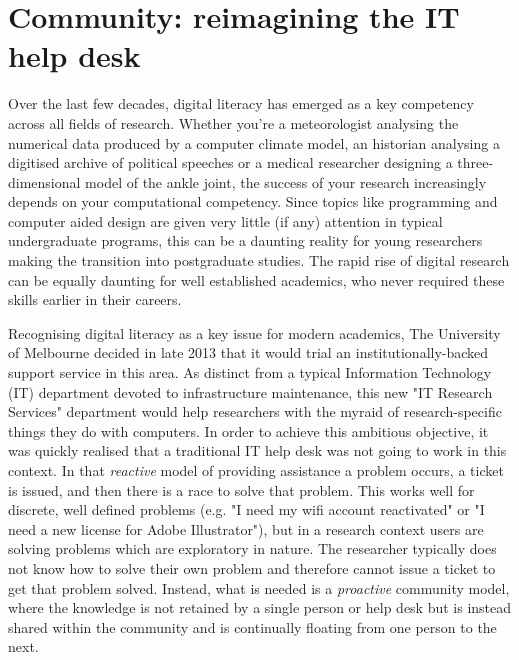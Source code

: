 \section{Community: reimagining the IT help desk}

Over the last few decades, digital literacy has emerged as a key competency across all fields of research. Whether you're a meteorologist analysing the numerical data produced by a computer climate model, an historian analysing a digitised archive of political speeches or a medical researcher designing a three-dimensional model of the ankle joint, the success of your research increasingly depends on your computational competency. Since topics like programming and computer aided design are given very little (if any) attention in typical undergraduate programs, this can be a daunting reality for young researchers making the transition into postgraduate studies. The rapid rise of digital research can be equally daunting for well established academics, who never required these skills earlier in their careers.

Recognising digital literacy as a key issue for modern academics, The University of Melbourne decided in late 2013 that it would trial an institutionally-backed support service in this area. As distinct from a typical Information Technology (IT) department devoted to infrastructure maintenance, this new "IT Research Services" department would help researchers with the myraid of research-specific things they do with computers. In order to achieve this ambitious objective, it was quickly realised that a traditional IT help desk was not going to work in this context. In that \textit{reactive} model of providing assistance a problem occurs, a ticket is issued, and then there is a race to solve that problem. This works well for discrete, well defined problems (e.g. "I need my wifi account reactivated" or "I need a new license for Adobe Illustrator"), but in a research context users are solving problems which are exploratory in nature. The researcher typically does not know how to solve their own problem and therefore cannot issue a ticket to get that problem solved. Instead, what is needed is a \textit{proactive} community model, where the knowledge is not retained by a single person or help desk but is instead shared within the community and is continually floating from one person to the next. 


